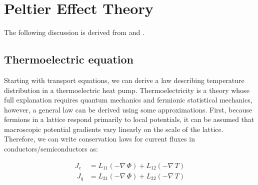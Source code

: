 \documentclass{article}
\begin{document}
%
%



\newpage
\appendix


\section{Peltier Effect Theory}
\label{app:PeltierEffectTheory}

The following discussion is derived from \cite{AshcroftMermin:1976} and \cite{SeebeckPeltier}.\\


\subsection{Thermoelectric equation}
\label{appsec:ThermoelectricEquations}

Starting with transport equations, we can derive a law describing temperature distribution in a thermoelectric heat pump. Thermoelectricity is a theory whose full explanation requires quantum mechanics and fermionic statistical mechanics, however, a general law can be derived using some approximations. First, because fermions in a lattice respond primarily to local potentials, it can be assumed that macroscopic potential gradients vary linearly on the scale of the lattice. Therefore, we can write conservation laws for current fluxes in conductors/semiconductors as:

\begin{align}
\label{eq:CurrentFlux}
	J_e &= L_{11} \left(- \nabla \, \Phi \right) + L_{12} \left(- \nabla \, T \right) \\
\;
\label{eq:HeatFlux}
	J_q &= L_{21} \left(- \nabla \, \Phi \right) + L_{22} \left(- \nabla \, T \right)
\end{align}
\end{document}
